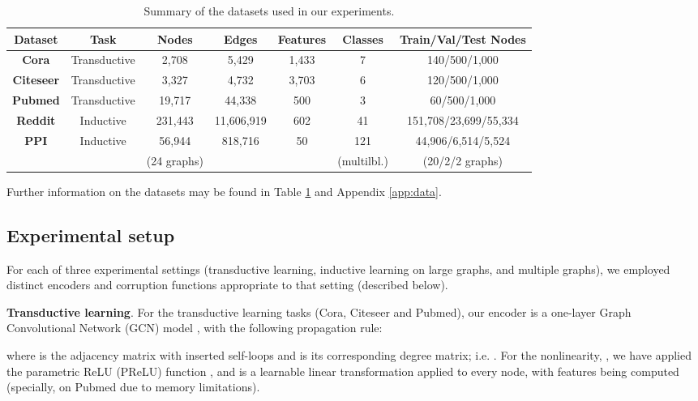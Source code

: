 \documentclass{article} \usepackage{iclr2019_conference,times}
\newcommand{\xhdr}[1]{{\noindent\bfseries #1}.}
\begin{document}
\begin{table}
\small
\caption{Summary of the datasets used in our experiments.}
\label{datasets}
\begin{center}
\begin{tabular}{c c c c c c c}
\toprule 
{\bf Dataset} & {\bf Task} & {\bf Nodes} & {\bf Edges} & {\bf Features} &  {\bf Classes} & {\bf Train/Val/Test Nodes} \\ \midrule
{\bf Cora} & Transductive & 2,708 & 5,429 & 1,433 & 7 & 140/500/1,000\\
{\bf Citeseer} & Transductive & 3,327 & 4,732 & 3,703 & 6 & 120/500/1,000 \\
{\bf Pubmed} & Transductive & 19,717 & 44,338 & 500 & 3 & 60/500/1,000\\
{\bf Reddit} & Inductive & 231,443 & 11,606,919 & 602 & 41 & 151,708/23,699/55,334\\
\multirow{2}{*}{\bf PPI} & \multirow{2}{*}{Inductive} & 56,944 & \multirow{2}{*}{818,716} & \multirow{2}{*}{50} & 121 & 44,906/6,514/5,524 \\
& & (24 graphs) & & & (multilbl.) & (20/2/2 graphs)\\
\bottomrule
\end{tabular}
\end{center}
\end{table}

Further information on the datasets may be found in Table \ref{datasets} and Appendix \ref{app:data}.

\subsection{Experimental setup}\label{sec:expt}

For each of three experimental settings (transductive learning, inductive learning on large graphs, and multiple graphs), we employed distinct encoders and corruption functions appropriate to that setting (described below). 


\xhdr{Transductive learning} 
For the transductive learning tasks (Cora, Citeseer and Pubmed), our encoder is a one-layer Graph Convolutional Network (GCN) model \citep{kipf2016semi}, with the following propagation rule:

where  is the adjacency matrix with inserted self-loops and  is its corresponding degree matrix; i.e. . For the nonlinearity, , we have applied the parametric ReLU (PReLU) function \citep{he2015delving}, and  is a learnable linear transformation applied to every node, with  features being computed (specially,  on Pubmed due to memory limitations).
\end{document}
